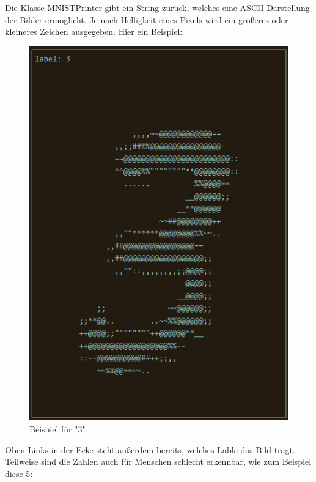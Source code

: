 \documentclass[12pt]{article}
\begin{document}
Die Klasse MNISTPrinter gibt ein String zurück, welches eine ASCII Darstellung der Bilder ermöglicht. Je nach Helligkeit eines Pixels wird ein größeres oder kleineres Zeichen ausgegeben. Hier ein Beispiel:
\begin{figure}[H]
\centering
\includegraphics[scale=0.60]{./Images/Pasted image 20231001133125.png}
\caption{Beispiel für "3"}
\label{Was kommt hier rein?}
\end{figure}
Oben Links in der Ecke steht außerdem bereits, welches Lable das Bild trägt. Teilweise sind die Zahlen auch für Menschen schlecht erkennbar, wie zum Beispiel diese 5:
\end{document}
